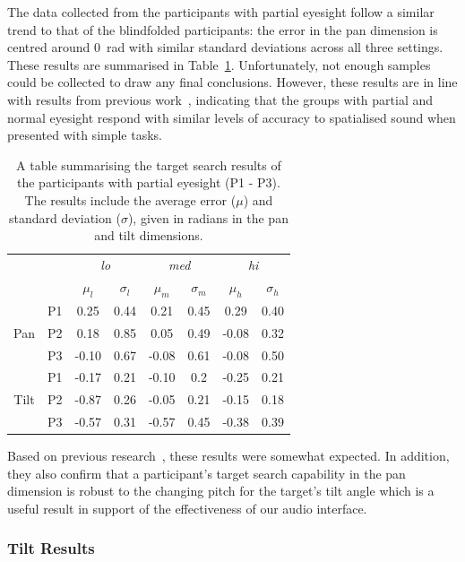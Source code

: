 \documentclass[sigconf, review=true, screen=true, anonymous=true]{acmart}
\begin{document}
The data collected from the participants with partial eyesight follow a similar trend to that of the blindfolded participants: the error in the pan dimension is centred around \SI{0}{\radian} with similar standard deviations across all three settings.
These results are summarised in Table~\ref{tab:vi-results}.
Unfortunately, not enough samples could be collected to draw any final conclusions.
However, these results are in line with results from previous work~\cite{zwiers2001spatial}, indicating that the groups with partial and normal eyesight respond with similar levels of accuracy to spatialised sound when presented with simple tasks. 

\begin{table}
  \centering
  \caption{A table summarising the target search results of the participants with partial eyesight (P1 - P3). The results include the average error ($\mu$) and standard deviation ($\sigma$), given in radians in the pan and tilt dimensions.}
  \label{tab:vi-results}
  \begin{tabular}{|c|c|cc|cc|cc|}
    \hline
    \multicolumn{2}{|c|}{} & \multicolumn{2}{c|}{\emph{lo}} & \multicolumn{2}{c|}{\emph{med}} & \multicolumn{2}{c|}{\emph{hi}} \\
    \multicolumn{2}{|c|}{} & $\mu_l$ & $\sigma_l$ & $\mu_m$ & $\sigma_m$ & $\mu_h$ & $\sigma_h$ \\\hline\hline
    & P1 & 0.25 & 0.44 & 0.21 & 0.45 & 0.29 & 0.40 \\ \cline{2-8}
    Pan & P2 & 0.18 & 0.85 & 0.05 & 0.49 & -0.08 & 0.32 \\ \cline{2-8}
    & P3 & -0.10 & 0.67 & -0.08 & 0.61 & -0.08 & 0.50 \\ \hline\hline
    & P1 & -0.17 & 0.21 & -0.10 & 0.2 & -0.25 & 0.21 \\ \cline{2-8}
    Tilt & P2 & -0.87 & 0.26 & -0.05 & 0.21 & -0.15 & 0.18 \\ \cline{2-8}
    & P3 & -0.57 & 0.31 & -0.57 & 0.45 & -0.38 & 0.39 \\ \hline
  \end{tabular}
\end{table}

Based on previous research~\cite{zwiers2001spatial}, these results were somewhat expected.
In addition, they also confirm that a participant's target search capability in the pan dimension is robust to the changing pitch for the target's tilt angle which is a useful result in support of the effectiveness of our audio interface.

\subsubsection{Tilt Results}
\label{sec:tilt-results}
\end{document}
